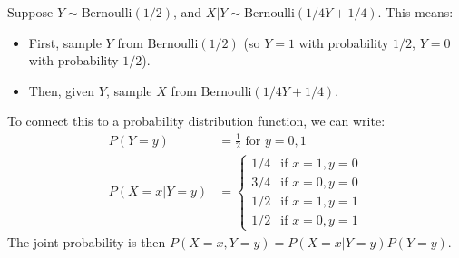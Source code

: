 \begin{example}
Suppose $Y \sim \text{Bernoulli}(1/2)$, and $X|Y \sim \text{Bernoulli}(1/4Y + 1/4)$. This means:
\begin{itemize}
  \item First, sample $Y$ from $\text{Bernoulli}(1/2)$ (so $Y=1$ with probability $1/2$, $Y=0$ with probability $1/2$).
  \item Then, given $Y$, sample $X$ from $\text{Bernoulli}(1/4Y + 1/4)$.
\end{itemize}
To connect this to a probability distribution function, we can write:
\begin{align*}
P(Y=y) &= \frac{1}{2} \text{ for } y=0,1 \\
P(X=x|Y=y) &= \begin{cases}
  1/4 & \text{if } x=1, y=0 \\
  3/4 & \text{if } x=0, y=0 \\
  1/2 & \text{if } x=1, y=1 \\
  1/2 & \text{if } x=0, y=1
\end{cases}
\end{align*}
The joint probability is then $P(X=x, Y=y) = P(X=x|Y=y)P(Y=y)$.
\end{example}


